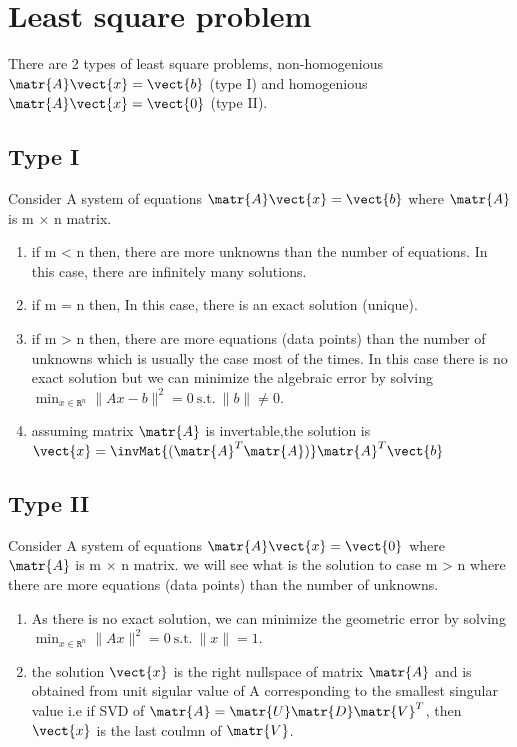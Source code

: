 \section{Least square problem} There are 2 types of least square problems, non-homogenious \( \matr{A} \vect{x} = \vect{b}\)  (type I) and homogenious  \( \matr{A} \vect{x} = \vect{0}\) (type II).
\subsection{Type I} Consider A system of equations \( \matr{A} \vect{x} = \vect{b}\) where $\matr{A}$ is m $\times$ n matrix. 
\begin{enumerate}
	\item if m < n then, there are more unknowns than the number of equations. In this case, there are infinitely many solutions.
	\item if m = n then, In this case, there is an exact solution (unique).
	\item if m > n then, there are more equations (data points) than the number of unknowns which is usually the  case most of the times. In this case there is no exact solution but we can minimize the algebraic error by solving \( \displaystyle \min_{x \in \mathtt{R}^n} \|Ax - b\|^2 = 0 \  \textrm{s.t.}\ \|b\| \ne 0\).
	\item assuming matrix $\matr{A}$ is invertable,the solution is \( \vect{x} = \invMat{(\matr{A}^T\matr{A})}\matr{A}^T\vect{b}\)
\end{enumerate}


\subsection{Type II} Consider A system of equations \( \matr{A} \vect{x} = \vect{0}\) where $\matr{A}$ is m $\times$ n matrix. we will see what is the solution to case m > n where there are more equations (data points) than the number of unknowns.
\begin{enumerate}
	\item As there is no exact solution, we can minimize the geometric error by solving \( \displaystyle \min_{x \in \mathtt{R}^n} \|Ax\|^2 = 0 \  \textrm{s.t.}\ \|x\| = 1\).
	\item the solution $\vect{x}$ is the right nullspace of matrix $\matr{A}$ and is obtained from unit sigular value of A corresponding to the smallest singular value i.e if SVD of $ \matr{A} = \matr{U}\matr{D}\matr{V}^T $, then $\vect{x}$ is the last coulmn of $\matr{V}$.
\end{enumerate}

